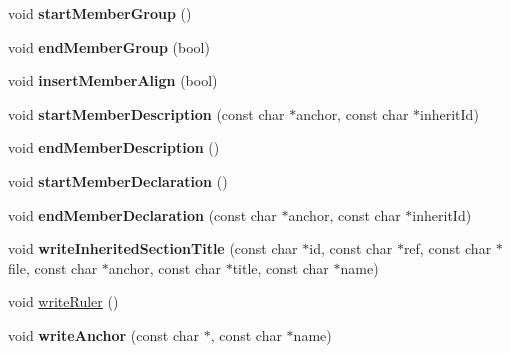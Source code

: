 \begin{DoxyCompactItemize}
\item 
\hypertarget{class_html_generator_a00a5eb19d218888ab778e3a2805f78a6}{void {\bfseries start\-Member\-Group} ()}\label{class_html_generator_a00a5eb19d218888ab778e3a2805f78a6}

\item 
\hypertarget{class_html_generator_af7073e7872d1d67efd015ff1855c8b02}{void {\bfseries end\-Member\-Group} (bool)}\label{class_html_generator_af7073e7872d1d67efd015ff1855c8b02}

\item 
\hypertarget{class_html_generator_a77394a193203024cb6dc72bea70ab195}{void {\bfseries insert\-Member\-Align} (bool)}\label{class_html_generator_a77394a193203024cb6dc72bea70ab195}

\item 
\hypertarget{class_html_generator_a7177e849629a299d3e7ec5f93e875295}{void {\bfseries start\-Member\-Description} (const char $\ast$anchor, const char $\ast$inherit\-Id)}\label{class_html_generator_a7177e849629a299d3e7ec5f93e875295}

\item 
\hypertarget{class_html_generator_a0dd91ddf8c2ef96803ec72c46964fdfd}{void {\bfseries end\-Member\-Description} ()}\label{class_html_generator_a0dd91ddf8c2ef96803ec72c46964fdfd}

\item 
\hypertarget{class_html_generator_adc7e1ef5ab7013afb090683808aec804}{void {\bfseries start\-Member\-Declaration} ()}\label{class_html_generator_adc7e1ef5ab7013afb090683808aec804}

\item 
\hypertarget{class_html_generator_a01efe005797c900e146b39b5b7be446f}{void {\bfseries end\-Member\-Declaration} (const char $\ast$anchor, const char $\ast$inherit\-Id)}\label{class_html_generator_a01efe005797c900e146b39b5b7be446f}

\item 
\hypertarget{class_html_generator_aa2c613cc72d6c92ca6ab9a8e6af0948c}{void {\bfseries write\-Inherited\-Section\-Title} (const char $\ast$id, const char $\ast$ref, const char $\ast$file, const char $\ast$anchor, const char $\ast$title, const char $\ast$name)}\label{class_html_generator_aa2c613cc72d6c92ca6ab9a8e6af0948c}

\item 
void \hyperlink{class_html_generator_a9fd641c75c5b5ee59a974c3b476584c2}{write\-Ruler} ()
\item 
\hypertarget{class_html_generator_a0405d062b549d2c71662810825769c32}{void {\bfseries write\-Anchor} (const char $\ast$, const char $\ast$name)}\label{class_html_generator_a0405d062b549d2c71662810825769c32}


\end{DoxyCompactItemize}
